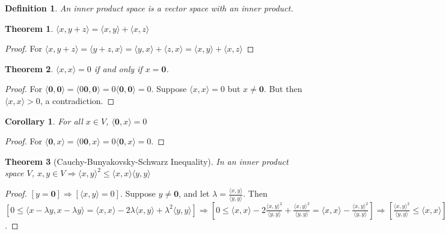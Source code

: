 \documentclass[12pt,oneside]{book}
\theoremstyle{mystyle}
\newtheorem{theorem}{Theorem}[section]
\newtheorem{definition}{Definition}[section]
\newtheorem{corollary}{Corollary}[section]
\begin{document}
\begin{definition}
An inner product space is a vector space with an inner product.
\end{definition}

\begin{theorem}
$\langle x,y+z \rangle = \langle x,y \rangle + \langle x,z \rangle$
\end{theorem}
\begin{proof}
For $\langle x,y+z \rangle = \langle y+z,x \rangle = \langle y,x \rangle + \langle z,x \rangle = \langle x,y \rangle + \langle x,z \rangle$
\end{proof}

\begin{theorem}
$\langle x,x \rangle = 0$ if and only if $x= \mathbf{0}$.
\end{theorem}
\begin{proof}
For $\langle \mathbf{0}, \mathbf{0} \rangle = \langle 0\mathbf{0},\mathbf{0} \rangle = 0 \langle \mathbf{0},\mathbf{0}\rangle = 0$. Suppose $\langle x,x \rangle =0$ but $x\ne \mathbf{0}$. But then $\langle x,x \rangle >0$, a contradiction.
\end{proof}

\begin{corollary}
For all $x\in V$, $\langle \mathbf{0},x \rangle = 0$
\end{corollary}
\begin{proof}
For $\langle \mathbf{0}, x\rangle = \langle 0\mathbf{0},x \rangle = 0\langle \mathbf{0},x\rangle = 0$.
\end{proof}

\begin{theorem}[Cauchy-Bunyakovsky-Schwarz Inequality]
In an inner product space $V$, $x,y\in V\Rightarrow \langle x,y \rangle^2 \leq \langle x,x \rangle \langle y,y \rangle$
\end{theorem}
\begin{proof}
$[y=\mathbf{0}]\Rightarrow [\langle x,y\rangle = 0]$. Suppose $y\ne \mathbf{0}$, and let $\lambda = \frac{\langle x,y \rangle}{\langle y,y \rangle}$. Then $[0 \leq \langle x-\lambda y, x-\lambda y\rangle = \langle x,x \rangle - 2\lambda \langle x,y \rangle + \lambda^2 \langle y,y \rangle]\Rightarrow [0\leq \langle x,x \rangle - 2\frac{\langle x,y \rangle ^2 }{\langle y,y \rangle} + \frac{\langle x,y \rangle^2}{\langle y,y \rangle} = \langle x,x \rangle - \frac{\langle x,y \rangle^2}{\langle y,y \rangle}]\Rightarrow [\frac{\langle x,y \rangle ^2}{\langle y,y \rangle} \leq \langle x,x \rangle]\Rightarrow [\langle x,y \rangle^2 \leq \langle x,x \rangle \langle y,y \rangle]$.
\end{proof}
\end{document}
